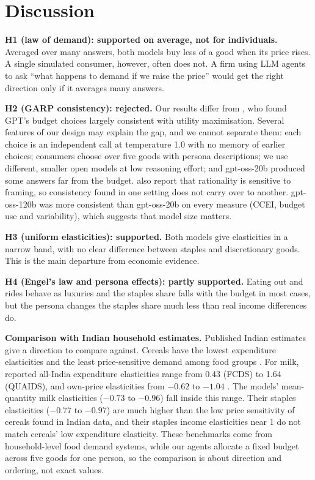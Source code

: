 \section{Discussion}\label{sec:discussion}
\textbf{H1 (law of demand): supported on average, not for individuals.} Averaged over many answers, both models buy less of a good when its price rises. A single simulated consumer, however, often does not. A firm using LLM agents to ask ``what happens to demand if we raise the price'' would get the right direction only if it averages many answers.

\textbf{H2 (GARP consistency): rejected.} Our results differ from \citet{chen2023}, who found GPT's budget choices largely consistent with utility maximisation. Several features of our design may explain the gap, and we cannot separate them: each choice is an independent call at temperature 1.0 with no memory of earlier choices; consumers choose over five goods with persona descriptions; we use different, smaller open models at low reasoning effort; and gpt-oss-20b produced some answers far from the budget. \citet{chen2023} also report that rationality is sensitive to framing, so consistency found in one setting does not carry over to another. gpt-oss-120b was more consistent than gpt-oss-20b on every measure (CCEI, budget use and variability), which suggests that model size matters.

\textbf{H3 (uniform elasticities): supported.} Both models give elasticities in a narrow band, with no clear difference between staples and discretionary goods. This is the main departure from economic evidence.

\textbf{H4 (Engel's law and persona effects): partly supported.} Eating out and rides behave as luxuries and the staples share falls with the budget in most cases, but the persona changes the staples share much less than real income differences do.

\textbf{Comparison with Indian household estimates.} Published Indian estimates give a direction to compare against. Cereals have the lowest expenditure elasticities and the least price-sensitive demand among food groups \citep{kumar2011}. For milk, reported all-India expenditure elasticities range from 0.43 (FCDS) to 1.64 (QUAIDS), and own-price elasticities from $-0.62$ to $-1.04$ \citep[as summarised in][]{nddbmilk}.  The models' mean-quantity milk elasticities ($-0.73$ to $-0.96$) fall inside this range. Their staples elasticities ($-0.77$ to $-0.97$) are much higher than the low price sensitivity of cereals found in Indian data, and their staples income elasticities near 1 do not match cereals' low expenditure elasticity. These benchmarks come from household-level food demand systems, while our agents allocate a fixed budget across five goods for one person, so the comparison is about direction and ordering, not exact values.

